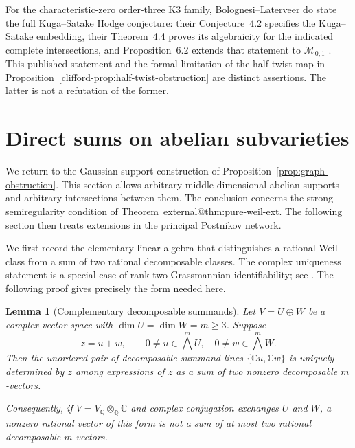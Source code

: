 \documentclass[11pt]{article}
\makeatletter
\providecommand{\compref}[1]{\csname external@#1\endcsname}
\newtheorem{lemma}[theorem]{Lemma}
\theoremstyle{definition}
\theoremstyle{remark}
\makeatother
\begin{document}
For the characteristic-zero order-three K3 family,
Bolognesi--Laterveer do state the full Kuga--Satake Hodge conjecture:
their Conjecture~4.2 specifies the Kuga--Satake embedding, their
Theorem~4.4 proves its algebraicity for the indicated complete
intersections, and Proposition~6.2 extends that statement to
$\mathcal M_{0,1}$ \cite[pp.~14--16]{clifford-BL}.
This published statement and the formal limitation of the half-twist
map in Proposition~\ref{clifford-prop:half-twist-obstruction} are
distinct assertions.  The latter is not a refutation of the former.

\section{Direct sums on abelian subvarieties}
\label{sec:subtorus-direct-sums}

We return to the Gaussian support construction of
Proposition~\ref{prop:graph-obstruction}. This section allows
arbitrary middle-dimensional abelian supports and arbitrary
intersections between them.  The conclusion concerns the strong
semiregularity condition of Theorem~\compref{thm:pure-weil-ext}.
The following section then treats extensions in the principal
Postnikov network.

We first record the elementary linear algebra that distinguishes a
rational Weil class from a sum of two rational decomposable classes.
The complex uniqueness statement is a special case of rank-two
Grassmannian identifiability; see \cite[Theorem~3.2 and Example~2.5]
{GalganoSecants}.  The following proof gives precisely the form needed
here.

\begin{lemma}[Complementary decomposable summands]
\label{lem:complementary-secants}
Let $V=U\oplus W$ be a complex vector space with
$\dim U=\dim W=m\geq3$.  Suppose
\[
 z=u+w,\qquad
 0\ne u\in\bigwedge^mU,\quad
 0\ne w\in\bigwedge^mW.
\]
Then the unordered pair of decomposable summand lines
$\{\mathbb C u,\mathbb C w\}$ is uniquely determined by $z$ among
expressions of $z$ as a sum of two nonzero decomposable $m$-vectors.

Consequently, if $V=V_{\mathbb Q}\otimes_{\mathbb Q}\mathbb C$ and
complex conjugation exchanges $U$ and $W$, a nonzero rational vector
of this form is not a sum of at most two rational decomposable
$m$-vectors.
\end{lemma}
\end{document}
